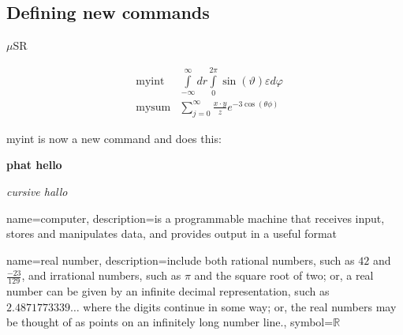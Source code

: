 \documentclass[12pt, a4paper, twopage]{scrartcl}
\begin{document}
\begin{appendix}
\section{Defining new commands}
\newcommand{\musr}{$\mu$SR }
\musr


\newcommand{\myint}{\int\limits_{-\infty}^{\infty} dr \int\limits_{0}^{2 \pi} \sin(\vartheta) \varepsilon d\varphi}

\newcommand{\mysum}[3]{\sum\limits_{j = 0}^{\infty} \frac{#1\cdot #2}{#3} e^{- 3 \cos(\theta \phi)}}

\begin{align*}
  &\text{myint} & \myint\\
  &\text{mysum} & \mysum{x}{y}{z}
\end{align*}

\renewcommand{\myint}{myint is now a new command and does this:}

\myint

\vspace{2cm}
\newcommand{\fett}[1]{{\textbf{#1}}}

\fett{phat hello}

\newcommand{\kursiv}[1]{{\textit{#1}}}

\kursiv{cursive hallo}



\end{appendix}










\printbibliography











{
	name=computer,
	description={is a programmable machine that receives input,
		stores and manipulates data, and provides
		output in a useful format}
}


{
	name={real number},
	description={include both rational numbers, such as $42$ and 
		$\frac{-23}{129}$, and irrational numbers, 
		such as $\pi$ and the square root of two; or,
		a real number can be given by an infinite decimal
		representation, such as $2.4871773339\ldots$ where
		the digits continue in some way; or, the real
		numbers may be thought of as points on an infinitely
		long number line.},
	symbol={\ensuremath{\mathbb{R}}}
}


\printglossary[title=My Glossary, toctitle=Glossary Title in ToC ]
\end{document}
